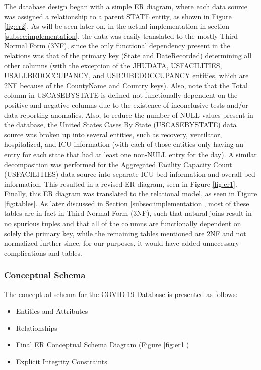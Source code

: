 \documentclass[11pt]{article}
\begin{document}
\noindent
The database design began with a simple ER diagram, where each data source was assigned a relationship to a parent STATE entity, as shown in Figure \ref{fig:er2}. As will be seen later on, in the actual implementation in section \ref{subsec:implementation}, the data was easily translated to the mostly Third Normal Form (3NF), since the only functional dependency present in the relations was that of the primary key (State and DateRecorded) determining all other columns (with the exception of the JHUDATA, USFACILITIES, USALLBEDOCCUPANCY, and USICUBEDOCCUPANCY entities, which are 2NF because of the CountyName and Country keys). Also, note that the Total column in USCASEBYSTATE is defined not functionally dependent on the positive and negative columns due to the existence of inconclusive tests and/or data reporting anomalies. Also, to reduce the number of NULL values present in the database, the United States Cases By State (USCASEBYSTATE) data source was broken up into several entities, such as recovery, ventilator, hospitalized, and ICU information (with each of those entities only having an entry for each state that had at least one non-NULL entry for the day). A similar decomposition was performed for the Aggregated Facility Capacity Count (USFACILITIES) data source into separate ICU bed information and overall bed information. This resulted in a revised ER diagram, seen in Figure \ref{fig:er1}. Finally, this ER diagram was translated to the relational model, as seen in Figure \ref{fig:tables}. As later discussed in Section \ref{subsec:implementation}, most of these tables are in fact in Third Normal Form (3NF), such that natural joins result in no spurious tuples and that all of the columns are functionally dependent on solely the primary key, while the remaining tables mentioned are 2NF and not normalized further since, for our purposes, it would have added unnecessary complications and tables. 

\subsubsection{Conceptual Schema}
\label{subsubsec:concept}

\noindent
The conceptual schema for the COVID-19 Database is presented as follows:
\vspace{-0.5em}
\begin{itemize}
    \item Entities and Attributes
    \item Relationships
    \item Final ER Conceptual Schema Diagram (Figure \ref{fig:er1})
    \item Explicit Integrity Constraints
\end{itemize}
\end{document}
